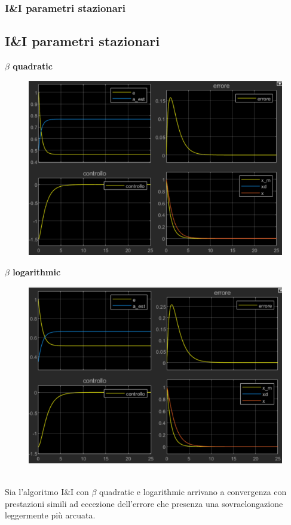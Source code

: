 \documentclass{beamer}
\begin{document}
\begin{frame}
	\frametitle{I\&I parametri stazionari}
	\subsection{I\&I parametri stazionari}
	\begin{minipage}[t]{0.45\textwidth}
		\textbf{\(\beta \) quadratic}
		\begin{figure}
			\includegraphics[scale=0.35]{2022-05-21-10-25-55.png} %
		\end{figure}
	\end{minipage}
	\begin{minipage}[t]{0.45\textwidth}
		\textbf{\(\beta \) logarithmic}
		\begin{figure}
			\includegraphics[scale=0.35]{2022-05-21-10-27-23.png} %
		\end{figure}
	\end{minipage}
	\vspace{0.1cm}\\
	Sia l'algoritmo I\&I con \(\beta \) quadratic e logarithmic arrivano a convergenza con prestazioni simili ad eccezione dell'errore che presenza una sovraelongazione leggermente più arcuata.
\end{frame}
\end{document}
